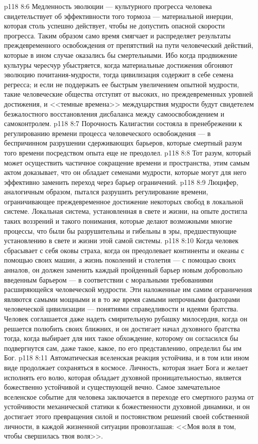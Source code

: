 \vs p118 8:6 Медленность эволюции --- культурного прогресса человека свидетельствует об эффективности того тормоза --- материальной инерции, которая столь успешно действует, чтобы не допустить опасной скорости прогресса. Таким образом само время смягчает и распределяет результаты преждевременного освобождения от препятствий на пути человеческий действий, которые в ином случае оказались бы смертельными. Ибо когда продвижение культуры чересчур убыстряется, когда материальные достижения обгоняют эволюцию почитания\hyp{}мудрости, тогда цивилизация содержит в себе семена регресса; и если не поддержать ее быстрым увеличением опытной мудрости, такие человеческие общества отступят от высоких, но преждевременных уровней достижения, и <<темные времена>> междуцарствия мудрости будут свидетелем безжалостного восстановления дисбаланса между самоосвобождением и самоконтролем.
\vs p118 8:7 Порочность Калигастии состояла в пренебрежении к регулированию времени процесса человеческого освобождения --- в беспричинном разрушении сдерживающих барьеров, которые смертный разум того времени посредством опыта еще не преодолел.
\vs p118 8:8 Тот разум, который может осуществить частичное сокращение времени и пространства, этим самым актом доказывает, что он обладает семенами мудрости, которые могут для него эффективно заменить переход через барьер ограничений.
\vs p118 8:9 Люцифер, аналогичным образом, пытался разрушить регулирование времени, ограничивающее преждевременное достижение некоторых свобод в локальной системе. Локальная система, установленная в свете и жизни, на опыте достигла таких воззрений и такого понимания, которые делают возможными многие процессы, что были бы разрушительны и гибельны в эры, предшествующие установлению в свете и жизни этой самой системы.
\vs p118 8:10 Когда человек сбрасывает с себя оковы страха, когда он преодолевает континенты и океаны с помощью своих машин, а жизнь поколений и столетия --- с помощью своих анналов, он должен заменить каждый пройденный барьер новым добровольно введенным барьером --- в соответствии с моральными требованиями расширяющейся человеческой мудрости. Эти наложенные им самим ограничения являются самыми мощными и в то же время самыми непрочными факторами человеческой цивилизации --- понятиями справедливости и идеями братства. Человек соглашается даже надеть смирительную рубашку милосердия, когда он решается полюбить своих ближних, и он достигает начал духовного братства тогда, когда выбирает для них такое обхождение, которому он согласился бы подвергнутся сам, даже такое, какое, по его представлению, определил бы им Бог.
\vs p118 8:11 Автоматическая вселенская реакция устойчива, и в том или ином виде продолжает сохраняться в космосе. Личность, которая знает Бога и желает исполнять его волю, которая обладает духовной проницательностью, является божественно устойчивой и существующей вечно. Самое замечательное вселенское событие для человека заключается в переходе его смертного разума от устойчивости механической статики к божественности духовной динамики, и он достигает этого превращения силой и постоянством решений своей собственной личности, в каждой жизненной ситуации провозглашая: <<Моя воля в том, чтобы свершилась твоя воля>>.
